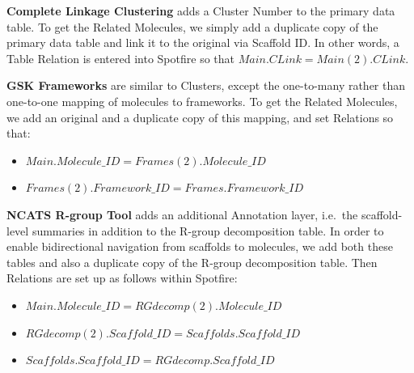 \documentclass[journal=jacsat,manuscript=article]{achemso}
\newcommand*\ie{i.e.~}
\begin{document}
{\bf Complete Linkage Clustering} adds a Cluster Number to the primary data table. To get the Related Molecules, we simply add a duplicate copy of the primary data table and link it to the original via Scaffold ID. In other words, a Table Relation is entered into Spotfire so that $Main.CLink = Main(2).CLink$.  

{\bf GSK Frameworks} are similar to Clusters, except the one-to-many rather than one-to-one mapping of molecules to frameworks. To get the Related Molecules, we add an original and a duplicate copy of this mapping, and set Relations so that:  
\begin{itemize}
\item $Main.Molecule\_ID = Frames(2).Molecule\_ID$
\item $Frames(2).Framework\_ID = Frames.Framework\_ID$
\end{itemize}

{\bf NCATS R-group Tool} adds an additional Annotation layer, \ie the scaffold-level summaries in addition to the R-group decomposition table. In order to enable bidirectional navigation from scaffolds to molecules, we add both these tables and also a duplicate copy of the R-group decomposition table. Then Relations are set up as follows within Spotfire:
\begin{itemize}
\item $Main.Molecule\_ID = RGdecomp(2).Molecule\_ID$
\item $RGdecomp(2).Scaffold\_ID = Scaffolds.Scaffold\_ID$
\item $Scaffolds.Scaffold\_ID = RGdecomp.Scaffold\_ID$
\end{itemize}   
\end{document}
